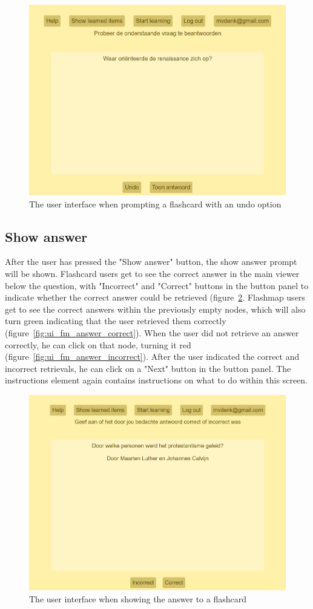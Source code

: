 \begin{figure}
    \centering
    \includegraphics[width=.8\textwidth]{img/ui_undo.png}
    \caption{The user interface when prompting a flashcard with an undo option}
    \label{fig:ui_undo}
\end{figure}

\subsection{Show answer}

After the user has pressed the "Show answer" button, the show answer prompt will be shown. Flashcard users get to see the correct answer in the main viewer below the question, with "Incorrect" and "Correct" buttons in the button panel to indicate whether the correct answer could be retrieved (figure~\ref{fig:ui_fc_answer}. Flashmap users get to see the correct answers within the previously empty nodes, which will also turn green indicating that the user retrieved them correctly (figure~\ref{fig:ui_fm_answer_correct}). When the user did not retrieve an answer correctly, he can click on that node, turning it red (figure~\ref{fig:ui_fm_answer_incorrect}). After the user indicated the correct and incorrect retrievals, he can click on a "Next" button in the button panel. The instructions element again contains instructions on what to do within this screen.

\begin{figure}
    \centering
    \includegraphics[width=.8\textwidth]{img/ui_fc_answer.png}
    \caption{The user interface when showing the answer to a flashcard}
    \label{fig:ui_fc_answer}
\end{figure}

